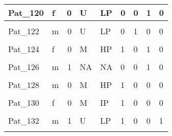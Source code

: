 \documentclass[11pt, a4paper, twosided]{book}
\begin{document}
\begin{longtable}[t]{l|l|r|l|l|l|l|l|l}
\hline
Pat\_120 & f & 0 & U & LP & 0 & 0 & 1 & 0\\
\hline
\cellcolor[HTML]{E2E868}{Pat\_121} & \cellcolor[HTML]{E2E868}{m} & \cellcolor[HTML]{E2E868}{0} & \cellcolor[HTML]{E2E868}{U} & \cellcolor[HTML]{E2E868}{LP} & \cellcolor[HTML]{E2E868}{0} & \cellcolor[HTML]{E2E868}{0} & \cellcolor[HTML]{E2E868}{0} & \cellcolor[HTML]{E2E868}{1}\\
\hline
Pat\_122 & m & 0 & U & LP & 0 & 1 & 0 & 0\\
\hline
\cellcolor[HTML]{E2E868}{Pat\_123} & \cellcolor[HTML]{E2E868}{m} & \cellcolor[HTML]{E2E868}{0} & \cellcolor[HTML]{E2E868}{U} & \cellcolor[HTML]{E2E868}{LP} & \cellcolor[HTML]{E2E868}{1} & \cellcolor[HTML]{E2E868}{0} & \cellcolor[HTML]{E2E868}{0} & \cellcolor[HTML]{E2E868}{1}\\
\hline
Pat\_124 & f & 0 & M & HP & 1 & 0 & 1 & 0\\
\hline
\cellcolor[HTML]{E2E868}{Pat\_125} & \cellcolor[HTML]{E2E868}{f} & \cellcolor[HTML]{E2E868}{0} & \cellcolor[HTML]{E2E868}{M} & \cellcolor[HTML]{E2E868}{HP} & \cellcolor[HTML]{E2E868}{1} & \cellcolor[HTML]{E2E868}{0} & \cellcolor[HTML]{E2E868}{0} & \cellcolor[HTML]{E2E868}{0}\\
\hline
Pat\_126 & m & 1 & NA & NA & 0 & 0 & 1 & 0\\
\hline
\cellcolor[HTML]{E2E868}{Pat\_127} & \cellcolor[HTML]{E2E868}{m} & \cellcolor[HTML]{E2E868}{0} & \cellcolor[HTML]{E2E868}{U} & \cellcolor[HTML]{E2E868}{LP} & \cellcolor[HTML]{E2E868}{1} & \cellcolor[HTML]{E2E868}{1} & \cellcolor[HTML]{E2E868}{0} & \cellcolor[HTML]{E2E868}{1}\\
\hline
Pat\_128 & m & 0 & M & HP & 1 & 0 & 0 & 0\\
\hline
\cellcolor[HTML]{E2E868}{Pat\_129} & \cellcolor[HTML]{E2E868}{m} & \cellcolor[HTML]{E2E868}{1} & \cellcolor[HTML]{E2E868}{U} & \cellcolor[HTML]{E2E868}{LP} & \cellcolor[HTML]{E2E868}{1} & \cellcolor[HTML]{E2E868}{0} & \cellcolor[HTML]{E2E868}{0} & \cellcolor[HTML]{E2E868}{0}\\
\hline
Pat\_130 & f & 0 & M & IP & 1 & 0 & 0 & 0\\
\hline
\cellcolor[HTML]{E2E868}{Pat\_131} & \cellcolor[HTML]{E2E868}{f} & \cellcolor[HTML]{E2E868}{0} & \cellcolor[HTML]{E2E868}{U} & \cellcolor[HTML]{E2E868}{LP} & \cellcolor[HTML]{E2E868}{1} & \cellcolor[HTML]{E2E868}{0} & \cellcolor[HTML]{E2E868}{0} & \cellcolor[HTML]{E2E868}{1}\\
\hline
Pat\_132 & m & 1 & U & LP & 1 & 0 & 0 & 1\\
\hline
\cellcolor[HTML]{E2E868}{Pat\_133} & \cellcolor[HTML]{E2E868}{m} & \cellcolor[HTML]{E2E868}{1} & \cellcolor[HTML]{E2E868}{U} & \cellcolor[HTML]{E2E868}{LP} & \cellcolor[HTML]{E2E868}{1} & \cellcolor[HTML]{E2E868}{0} & \cellcolor[HTML]{E2E868}{0} & \cellcolor[HTML]{E2E868}{1}\\

\end{longtable}
\end{document}
